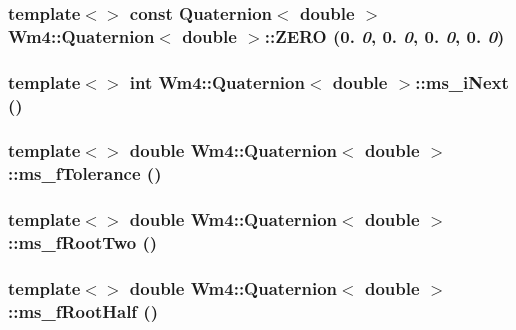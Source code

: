 \subsubsection{\setlength{\rightskip}{0pt plus 5cm}template$<$$>$ const {\bf Quaternion}$<$ double $>$ {\bf Wm4::Quaternion}$<$ double $>$::{\bf ZERO} (0. {\em 0}, 0. {\em 0}, 0. {\em 0}, 0. {\em 0})}\label{classWm4_1_1Quaternion_ab6454cbc8959189744465ed47ae90b0}


\subsubsection{\setlength{\rightskip}{0pt plus 5cm}template$<$$>$ int {\bf Wm4::Quaternion}$<$ double $>$::ms\_\-i\-Next ()}\label{classWm4_1_1Quaternion_bf4f129244f2ca051aaa91c3465f1f9d}


\subsubsection{\setlength{\rightskip}{0pt plus 5cm}template$<$$>$ double {\bf Wm4::Quaternion}$<$ double $>$::ms\_\-f\-Tolerance ()}\label{classWm4_1_1Quaternion_a9de22d187cdd57312c6f9d99a5f2f66}


\subsubsection{\setlength{\rightskip}{0pt plus 5cm}template$<$$>$ double {\bf Wm4::Quaternion}$<$ double $>$::ms\_\-f\-Root\-Two ()}\label{classWm4_1_1Quaternion_3b773db0e10149d2ca726ad44b072ee9}


\subsubsection{\setlength{\rightskip}{0pt plus 5cm}template$<$$>$ double {\bf Wm4::Quaternion}$<$ double $>$::ms\_\-f\-Root\-Half ()}\label{classWm4_1_1Quaternion_8699c62d3ca15c8bb09509a6efe87aaf}




